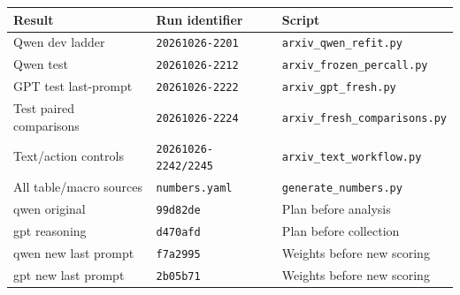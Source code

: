 \begin{tabular}{lll}
\toprule
Result & Run identifier & Script \\
\midrule
Qwen dev ladder & \texttt{20261026-2201} & \texttt{arxiv\_qwen\_refit.py} \\
Qwen test & \texttt{20261026-2212} & \texttt{arxiv\_frozen\_percall.py} \\
GPT test last-prompt & \texttt{20261026-2222} & \texttt{arxiv\_gpt\_fresh.py} \\
Test paired comparisons & \texttt{20261026-2224} & \texttt{arxiv\_fresh\_comparisons.py} \\
Text/action controls & \texttt{20261026-2242/2245} & \texttt{arxiv\_text\_workflow.py} \\
All table/macro sources & \texttt{numbers.yaml} & \texttt{generate\_numbers.py} \\
qwen original & \texttt{99d82de} & Plan before analysis \\
gpt reasoning & \texttt{d470afd} & Plan before collection \\
qwen new last prompt & \texttt{f7a2995} & Weights before new scoring \\
gpt new last prompt & \texttt{2b05b71} & Weights before new scoring \\
\bottomrule
\end{tabular}
